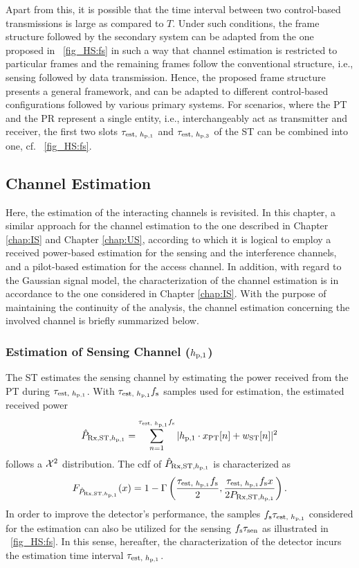 Apart from this, it is possible that the time interval between two control-based transmissions is large as compared to $T$. Under such conditions, the frame structure followed by the secondary system can be adapted from the one proposed in \figurename~\ref{fig_HS:fs} in such a way that channel estimation is restricted to particular frames and the remaining frames follow the conventional structure, i.e., sensing followed by data transmission. Hence, the proposed frame structure presents a general framework, and can be adapted to different control-based configurations followed by various primary systems. For scenarios, where the PT and the PR represent a single entity, i.e., interchangeably act as transmitter and receiver, the first two slots $\tau_{\text{est, $h_{\text{p,1}}$}}$ and $\tau_{\text{est, $h_{\text{p,3}}$}}$ of the ST can be combined into one, cf. \figurename~\ref{fig_HS:fs}. 


\subsection{Channel Estimation}
Here, the estimation of the interacting channels is revisited. In this chapter, a similar approach for the channel estimation to the one described in Chapter \ref{chap:IS} and Chapter \ref{chap:US}, according to which it is logical to employ a received power-based estimation for the sensing and the interference channels, and a pilot-based estimation for the access channel. In addition, with regard to the Gaussian signal model, the characterization of the channel estimation is in accordance to the one considered in Chapter \ref{chap:IS}. With the purpose of maintaining the continuity of the analysis, the channel estimation concerning the involved channel is briefly summarized below. 
\subsubsection*{Estimation of Sensing Channel ($h_{\text{p,1}}$)}
The ST estimates the sensing channel by estimating the power received from the PT during $\tau_{\text{est, $h_{\text{p,1}}$}}$. With $\tau_{\text{est, $h_{\text{p,1}}$}} f_{\text{s}}$ samples used for estimation, the estimated received power \begin{equation}\hat{P}_{\text{Rx,ST,$h_{\text{p,1}}$}} = \sum_{n = 1}^{\tau_{\text{est, $h_{\text{p,1}}$}} f_{\text{s}}} |h_{\text{p,1}} \cdot x_{\text{PT}}[n] + w_{\text{ST}}[n]|^2\end{equation} follows a $\cchi2$ distribution.
The cdf of $\hat{P}_{\text{Rx,ST,$h_{\text{p,1}}$}}$ is characterized as
\begin{align}
F_{\hat{P}_{\text{Rx,ST,$h_{\text{p,1}}$}}}(x) = 1 - \Gamma \left( \frac{\tau_{\text{est, $h_{\text{p,1}}$}} f_{\text{s}}}{2}, \frac{\tau_{\text{est, $h_{\text{p,1}}$}} f_{\text{s}} x}{2 P_{\text{Rx,ST,$h_{\text{p,1}}$}}} \right) \label{eq_HS:fprcvdstpt}.
\end{align}
In order to improve the detector's performance, the samples $f_{\text{s}} \tau_{\text{est, $h_{\text{p,1}}$}}$ considered for the estimation can also be utilized for the sensing $f_{\text{s}} \tau_{\text{sen}}$ as illustrated in \figurename~\ref{fig_HS:fs}. In this sense, hereafter, the characterization of the detector incurs the estimation time interval $\tau_{\text{est, $h_{\text{p,1}}$}}$. 
  
